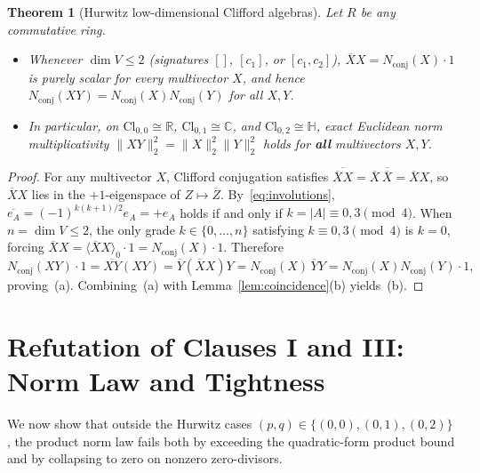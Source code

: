 \documentclass[11pt]{article}
\newtheorem{theorem}{Theorem}[section]
\theoremstyle{definition}
\newcommand{\Cl}{\mathrm{Cl}}
\newcommand{\R}{\mathbb{R}}
\newcommand{\C}{\mathbb{C}}
\newcommand{\HH}{\mathbb{H}}
\newcommand{\Nconj}{N_{\mathrm{conj}}}
\begin{document}
\begin{theorem}[Hurwitz low-dimensional Clifford algebras]\label{thm:hurwitz}
Let $R$ be any commutative ring.
\begin{itemize}
  \item[(a)] Whenever $\dim V\le 2$ (signatures $[]$, $[c_1]$, or $[c_1,c_2]$), $\overline{X}X=\Nconj(X)\cdot 1$ is purely scalar for every multivector $X$, and hence $\Nconj(XY)=\Nconj(X)\Nconj(Y)$ for all $X,Y$.
  \item[(b)] In particular, on $\Cl_{0,0}\cong\R$, $\Cl_{0,1}\cong\C$, and $\Cl_{0,2}\cong\HH$, exact Euclidean norm multiplicativity $\|XY\|_2^2=\|X\|_2^2\|Y\|_2^2$ holds for \textbf{all} multivectors $X,Y$.
\end{itemize}
\end{theorem}
\begin{proof}
For any multivector $X$, Clifford conjugation satisfies $\overline{\overline{X}X}=\overline{X}\,\overline{\overline{X}}=\overline{X}X$, so $\overline{X}X$ lies in the $+1$-eigenspace of $Z\mapsto\overline{Z}$. By~\eqref{eq:involutions}, $\overline{e_A}=(-1)^{k(k+1)/2}e_A=+e_A$ holds if and only if $k=|A|\equiv 0,3\pmod 4$. When $n=\dim V\le 2$, the only grade $k\in\{0,\dots,n\}$ satisfying $k\equiv 0,3\pmod 4$ is $k=0$, forcing $\overline{X}X=\langle\overline{X}X\rangle_0\cdot 1=\Nconj(X)\cdot 1$. Therefore
\[
  \Nconj(XY)\cdot 1 = \overline{XY}(XY) = \overline{Y}(\overline{X}X)Y = \Nconj(X)\,\overline{Y}Y = \Nconj(X)\Nconj(Y)\cdot 1,
\]
proving~(a). Combining~(a) with Lemma~\ref{lem:coincidence}(b) yields~(b).
\end{proof}

\section{Refutation of Clauses I and III: Norm Law and Tightness}

We now show that outside the Hurwitz cases $(p,q)\in\{(0,0),(0,1),(0,2)\}$, the product norm law fails both by exceeding the quadratic-form product bound and by collapsing to zero on nonzero zero-divisors.
\end{document}
